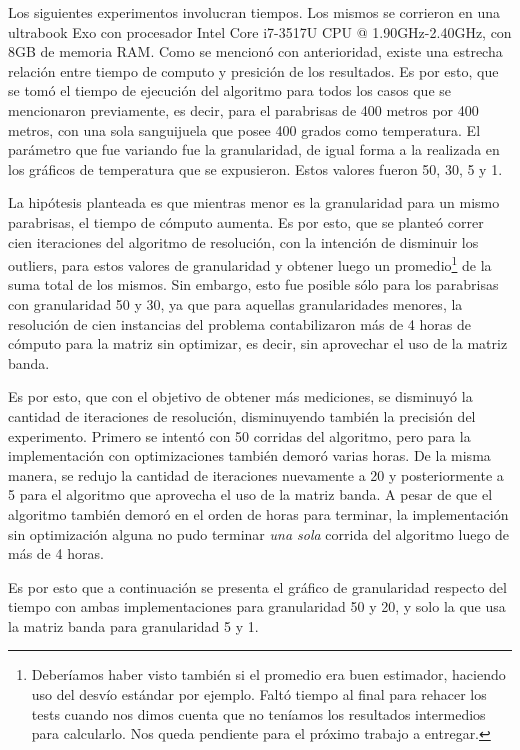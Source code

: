 \par 
	Los siguientes experimentos involucran tiempos. Los mismos se corrieron en una ultrabook Exo con procesador Intel Core i7-3517U CPU @ 1.90GHz-2.40GHz, con 8GB de memoria RAM.  
	Como se mencionó con anterioridad, existe una estrecha relación entre tiempo de computo y presición de los resultados. Es por esto, que se tomó el tiempo de ejecución del algoritmo para todos los casos que se mencionaron previamente, es decir, para el parabrisas de 400 metros por 400 metros, con una sola sanguijuela que posee 400 grados como temperatura. El parámetro que fue variando fue la granularidad, de igual forma a la realizada en los gráficos de temperatura que se expusieron. Estos valores fueron 50, 30, 5 y 1. 
	\par 
	La hipótesis planteada es que mientras menor es la granularidad para un mismo parabrisas, el tiempo de cómputo aumenta. Es por esto, que se planteó correr cien iteraciones del algoritmo de resolución, con la intención de disminuir los outliers, para estos valores de granularidad  y obtener luego un promedio\footnote{Deberíamos haber visto también si el promedio era buen estimador, haciendo uso del desvío estándar por ejemplo. Faltó tiempo al final para rehacer los tests cuando nos dimos cuenta que no teníamos los resultados intermedios para calcularlo. Nos queda pendiente para el próximo trabajo a entregar.} de la suma total de los mismos. Sin embargo, esto fue posible sólo para los parabrisas con granularidad 50 y 30, ya que para aquellas granularidades menores, la resolución de cien instancias del problema contabilizaron más de 4 horas de cómputo para la matriz sin optimizar, es decir, sin aprovechar el uso de la matriz banda.
	\par 
	Es por esto, que con el objetivo de obtener más mediciones, se disminuyó la cantidad de iteraciones de resolución, disminuyendo también la precisión del experimento. Primero se intentó con 50 corridas del algoritmo, pero para la implementación con optimizaciones también demoró varias horas. De la misma manera, se redujo la cantidad de iteraciones nuevamente a 20 y posteriormente a 5 para el algoritmo que aprovecha el uso de la matriz banda. A pesar de que el algoritmo también demoró en el orden de horas para terminar, la implementación sin optimización alguna no pudo terminar \textit{una sola} corrida del algoritmo luego de más de 4 horas. 
	\par 
	Es por esto que a continuación se presenta el gráfico de granularidad respecto del tiempo con ambas implementaciones para granularidad 50 y 20, y solo la que usa la matriz banda para granularidad 5 y 1.
